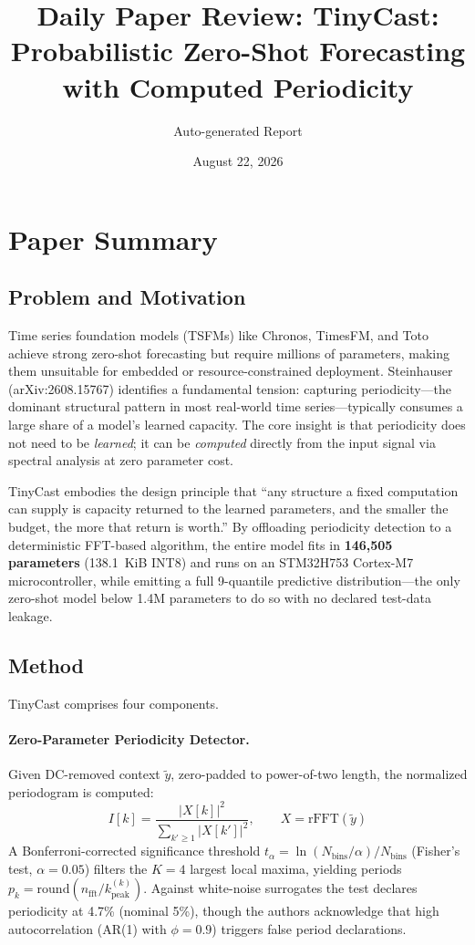 \documentclass[11pt,a4paper]{article}
\title{Daily Paper Review: TinyCast: Probabilistic Zero-Shot Forecasting with Computed Periodicity}
\author{Auto-generated Report}
\date{August 22, 2026}
\begin{document}
\maketitle

\section{Paper Summary}

\subsection{Problem and Motivation}
Time series foundation models (TSFMs) like Chronos, TimesFM, and Toto achieve strong zero-shot forecasting but require millions of parameters, making them unsuitable for embedded or resource-constrained deployment. Steinhauser (arXiv:2608.15767) identifies a fundamental tension: capturing periodicity---the dominant structural pattern in most real-world time series---typically consumes a large share of a model's learned capacity. The core insight is that periodicity does not need to be \emph{learned}; it can be \emph{computed} directly from the input signal via spectral analysis at zero parameter cost.

TinyCast embodies the design principle that ``any structure a fixed computation can supply is capacity returned to the learned parameters, and the smaller the budget, the more that return is worth.'' By offloading periodicity detection to a deterministic FFT-based algorithm, the entire model fits in \textbf{146,505 parameters} (138.1~KiB INT8) and runs on an STM32H753 Cortex-M7 microcontroller, while emitting a full 9-quantile predictive distribution---the only zero-shot model below 1.4M parameters to do so with no declared test-data leakage.

\subsection{Method}
TinyCast comprises four components.

\paragraph{Zero-Parameter Periodicity Detector.} Given DC-removed context $\tilde{y}$, zero-padded to power-of-two length, the normalized periodogram is computed:
\begin{equation}
I[k] = \frac{|X[k]|^2}{\sum_{k' \geq 1}|X[k']|^2}, \qquad X = \text{rFFT}(\tilde{y})
\end{equation}
A Bonferroni-corrected significance threshold $t_\alpha = \ln(N_{\text{bins}}/\alpha)/N_{\text{bins}}$ (Fisher's test, $\alpha{=}0.05$) filters the $K{=}4$ largest local maxima, yielding periods $p_k = \text{round}(n_{\text{fft}}/k_{\text{peak}}^{(k)})$. Against white-noise surrogates the test declares periodicity at 4.7\% (nominal 5\%), though the authors acknowledge that high autocorrelation (AR(1) with $\phi{=}0.9$) triggers false period declarations.
\end{document}
